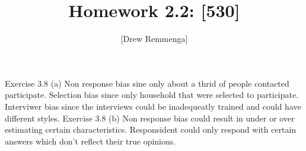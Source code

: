 \documentclass[10pt, oneside]{article}
\title{Homework 2.2: [530]}
\author{[Drew Remmenga]}
\begin{document}
\maketitle
\pagebreak
Exercise 3.8 (a)
Non response bias sine only about a thrid of people contacted participate. 
Selection bias since only household that were selected to participate. Interviwer bias since the interviews could be inadequeatly trained and could have different styles.
\clearpage
Exercise 3.8 (b)
Non response bias could result in under or over estimating certain characteristics. Responsident could only respond with certain answers which don't reflect their true opinions. 
\end{document}
